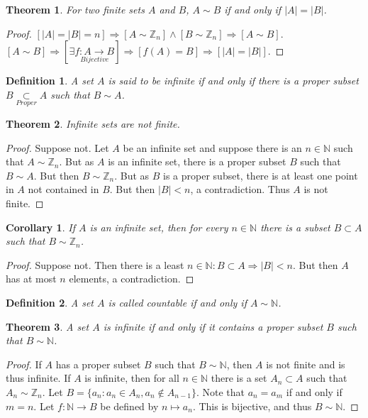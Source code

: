 \documentclass[oneside]{book}
\theoremstyle{mystyle}
\newtheorem{theorem}{Theorem}[section]
\newtheorem{definition}{Definition}[section]
\newtheorem{corollary}{Corollary}[section]
\begin{document}
\begin{theorem}
For two finite sets $A$ and $B$, $A\sim B$ if and only if $|A|=|B|$.
\end{theorem}
\begin{proof}
$[|A|=|B|=n]\Rightarrow[A\sim \mathbb{Z}_n]\land[B\sim \mathbb{Z}_n]\Rightarrow [A\sim B]$. $[A\sim B]\Rightarrow [\exists \underset{Bijective}{f:A\rightarrow B}]\Rightarrow [f(A) = B]\Rightarrow [|A|=|B|]$.
\end{proof}

\begin{definition}
A set $A$ is said to be infinite if and only if there is a proper subset $B\underset{Proper}\subset A$ such that $B\sim A$.
\end{definition}

\begin{theorem}
Infinite sets are not finite.
\end{theorem}
\begin{proof}
Suppose not. Let $A$ be an infinite set and suppose there is an $n\in \mathbb{N}$ such that $A\sim \mathbb{Z}_n$. But as $A$ is an infinite set, there is a proper subset $B$ such that $B\sim A$. But then $B\sim \mathbb{Z}_n$. But as $B$ is a proper subset, there is at least one point in $A$ not contained in $B$. But then $|B|<n$, a contradiction. Thus $A$ is not finite.
\end{proof}

\begin{corollary}
If $A$ is an infinite set, then for every $n\in \mathbb{N}$ there is a subset $B\subset A$ such that $B\sim \mathbb{Z}_n$.
\end{corollary}
\begin{proof}
Suppose not. Then there is a least $n\in \mathbb{N}:B\subset A\Rightarrow |B|<n$. But then $A$ has at most $n$ elements, a contradiction.
\end{proof}

\begin{definition}
A set $A$ is called countable if and only if $A\sim \mathbb{N}$.
\end{definition}

\begin{theorem}
A set $A$ is infinite if and only if it contains a proper subset $B$ such that $B\sim \mathbb{N}$.
\end{theorem}
\begin{proof}
If $A$ has a proper subset $B$ such that $B\sim \mathbb{N}$, then $A$ is not finite and is thus infinite. If $A$ is infinite, then for all $n\in \mathbb{N}$ there is a set $A_n\subset A$ such that $A_n \sim \mathbb{Z}_n$. Let $B = \{a_n: a_n \in A_n, a_n \notin A_{n-1}\}$. Note that $a_{n} = a_{m}$ if and only if $m= n$. Let $f:\mathbb{N} \rightarrow B$ be defined by $n\mapsto a_n$. This is bijective, and thus $B\sim \mathbb{N}$.
\end{proof}
\end{document}

